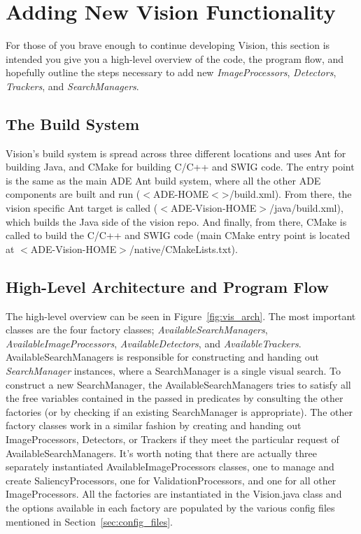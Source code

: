\documentclass{article}
\begin{document}
\section{Adding New Vision Functionality}
For those of you brave enough to continue developing Vision, this section
is intended you give you a high-level overview of the code, the program flow,
and hopefully outline the steps necessary to add new {\em ImageProcessors},
{\em Detectors}, {\em Trackers}, and {\em SearchManagers}.

\subsection{The Build System}
Vision's build system is spread across three different locations and uses
Ant for building Java, and CMake for building C/C++ and SWIG code. The entry
point is the same as the main ADE Ant build system, where all the other ADE components 
are built and run ($<$ADE-HOME$<$>/build.xml). From there, the vision specific
Ant target is called ($<$ADE-Vision-HOME$>$/java/build.xml), which builds the Java side
of the vision repo. And finally, from there, CMake is called to build the C/C++ and
SWIG code (main CMake entry point is located at $<$ADE-Vision-HOME$>$/native/CMakeLists.txt).

\subsection{High-Level Architecture and Program Flow}
The high-level overview can be seen in Figure~\ref{fig:vis_arch}. The most important
classes are the four factory classes; {\em AvailableSearchManagers},
{\em AvailableImageProcessors}, {\em AvailableDetectors}, and {\em AvailableTrackers}.
AvailableSearchManagers is responsible for constructing and handing out
{\em SearchManager} instances, where a SearchManager is a single visual search.
To construct a new SearchManager, the AvailableSearchManagers tries to 
satisfy all the free variables contained in the passed in predicates by
consulting the other factories (or by checking if an existing SearchManager
is appropriate). The other factory classes work in a similar fashion by
creating and handing out ImageProcessors, Detectors, or Trackers if they
meet the particular request of AvailableSearchManagers. It's worth noting that
there are actually three separately instantiated AvailableImageProcessors classes,
one to manage and create SaliencyProcessors, one for ValidationProcessors, and one
for all other ImageProcessors. All the factories are instantiated in the 
Vision.java class and the options available in each factory are populated
by the various config files mentioned in Section~\ref{sec:config_files}.
\end{document}
